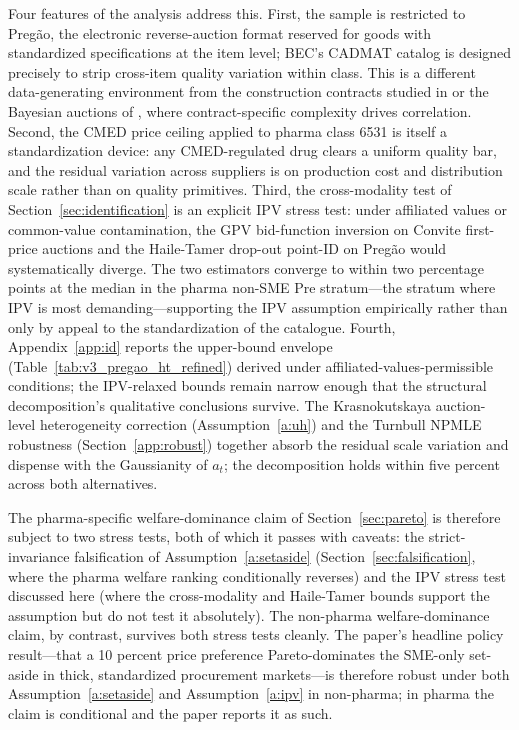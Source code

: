 Four features of the analysis address this. First, the sample is restricted to Preg\~ao, the electronic reverse-auction format reserved for goods with standardized specifications at the item level; BEC's CADMAT catalog is designed precisely to strip cross-item quality variation within class. This is a different data-generating environment from the construction contracts studied in \citet{bajari2014} or the Bayesian auctions of \citet{hendricks2003}, where contract-specific complexity drives correlation. Second, the CMED price ceiling applied to pharma class 6531 is itself a standardization device: any CMED-regulated drug clears a uniform quality bar, and the residual variation across suppliers is on production cost and distribution scale rather than on quality primitives. Third, the cross-modality test of Section~\ref{sec:identification} is an explicit IPV stress test: under affiliated values or common-value contamination, the GPV bid-function inversion on Convite first-price auctions and the Haile-Tamer drop-out point-ID on Preg\~ao would systematically diverge. The two estimators converge to within two percentage points at the median in the pharma non-SME Pre stratum---the stratum where IPV is most demanding---supporting the IPV assumption empirically rather than only by appeal to the standardization of the catalogue. Fourth, Appendix~\ref{app:id} reports the \citet{haile2003} upper-bound envelope (Table~\ref{tab:v3_pregao_ht_refined}) derived under affiliated-values-permissible conditions; the IPV-relaxed bounds remain narrow enough that the structural decomposition's qualitative conclusions survive. The Krasnokutskaya auction-level heterogeneity correction (Assumption~\ref{a:uh}) and the Turnbull NPMLE robustness (Section~\ref{app:robust}) together absorb the residual scale variation and dispense with the Gaussianity of $a_t$; the decomposition holds within five percent across both alternatives.

The pharma-specific welfare-dominance claim of Section~\ref{sec:pareto} is therefore subject to two stress tests, both of which it passes with caveats: the strict-invariance falsification of Assumption~\ref{a:setaside} (Section~\ref{sec:falsification}, where the pharma welfare ranking conditionally reverses) and the IPV stress test discussed here (where the cross-modality and Haile-Tamer bounds support the assumption but do not test it absolutely). The non-pharma welfare-dominance claim, by contrast, survives both stress tests cleanly. The paper's headline policy result---that a 10 percent price preference Pareto-dominates the SME-only set-aside in thick, standardized procurement markets---is therefore robust under both Assumption~\ref{a:setaside} and Assumption~\ref{a:ipv} in non-pharma; in pharma the claim is conditional and the paper reports it as such.

